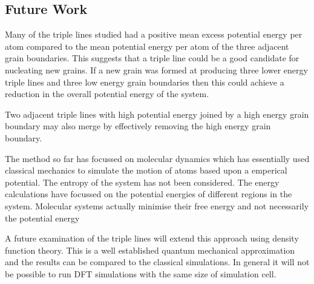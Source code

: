 \documentclass[12pt,a4paper]{book}
\begin{document}
\subsection{Future Work}


Many of the triple lines studied had a positive mean excess potential energy per atom compared to the mean potential energy per atom of the three adjacent grain boundaries. This suggests that a triple line could be a good candidate for nucleating new grains. If a new grain was formed at producing three lower energy triple lines and three low energy grain boundaries then this could achieve a reduction in the overall potential energy of the system.

Two adjacent triple lines with high potential energy joined by a high energy grain boundary may also merge by effectively removing the high energy grain boundary. 


The method so far has focussed on molecular dynamics which has essentially used classical mechanics to simulate the motion of atoms based upon a emperical potential. The entropy of the system has not been considered. The energy calculations have focussed on the potential energies of different regions in the system. Molecular systems actually minimise their free energy and not necessarily the potential energy 

A future examination of the triple lines will extend this approach using density function theory. This is a well established quantum mechanical approximation and the results can be compared to the classical simulations. In general it will not be possible to run DFT simulations with the same size of simulation cell.  

 
\end{document}
